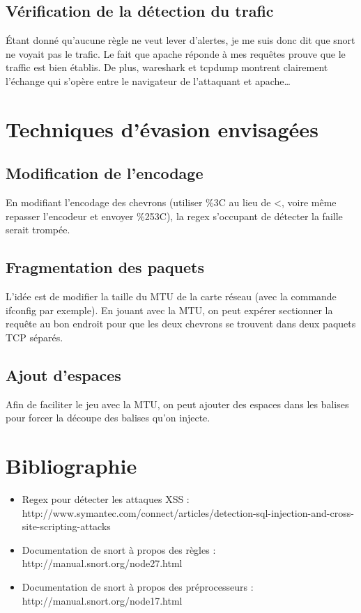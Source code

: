 \documentclass[oneside,10pt]{article}
\begin{document}
\subsection{V\'erification de la d\'etection du trafic}
\'Etant donn\'e qu'aucune r\`egle ne veut lever d'alertes, je me suis donc dit que snort ne voyait pas le trafic.
Le fait que apache r\'eponde \`a mes requ\^etes prouve que le traffic est bien \'etablis.
De plus, wareshark et tcpdump montrent clairement l'\'echange qui s'op\`ere entre le navigateur de l'attaquant et apache\ldots

\section{Techniques d'\'evasion envisag\'ees}
\subsection{Modification de l'encodage}
En modifiant l'encodage des chevrons (utiliser \%3C au lieu de \textless, voire m\^eme repasser l'encodeur et envoyer \%253C), la regex s'occupant de d\'etecter la faille serait tromp\'ee.
\subsection{Fragmentation des paquets}
L'id\'ee est de modifier la taille du MTU de la carte r\'eseau (avec la commande ifconfig par exemple).
En jouant avec la MTU, on peut exp\'erer sectionner la requ\^ete au bon endroit pour que les deux chevrons se trouvent dans deux paquets TCP s\'epar\'es.
\subsection{Ajout d'espaces}
Afin de faciliter le jeu avec la MTU, on peut ajouter des espaces dans les balises pour forcer la d\'ecoupe des balises qu'on injecte.

\section{Bibliographie}
\begin{itemize}
\item Regex pour d\'etecter les attaques XSS :\\
http://www.symantec.com/connect/articles/detection-sql-injection-and-cross-site-scripting-attacks
\item Documentation de snort \`a propos des r\`egles :\\
http://manual.snort.org/node27.html
\item Documentation de snort \`a propos des pr\'eprocesseurs :\\
http://manual.snort.org/node17.html
\end{itemize}
\end{document}
